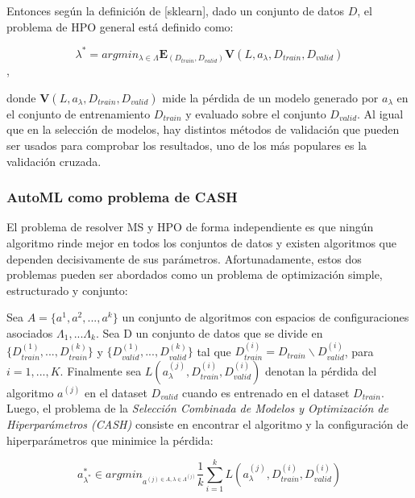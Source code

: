 Entonces según la definición de [sklearn], dado un conjunto de datos $D$, el problema de HPO general está definido como:

\begin{equation}
	\lambda^* = argmin_{\lambda \in \Lambda}\textbf{E}_{(D_{train}, D_{valid})}\textbf{V}(L, a_\lambda, D_{train}, D_{valid})
\end{equation},

donde $\textbf{V}(L, a_\lambda, D_{train}, D_{valid})$ mide la pérdida de un modelo generado por $a_\lambda$ en el conjunto de entrenamiento $D_{train}$ y evaluado sobre el conjunto $D_{valid}$. Al igual que en la selección de modelos, hay distintos métodos de validación que pueden ser usados para comprobar los resultados, uno de los más populares es la validación cruzada.

\subsubsection{AutoML como problema de CASH} 

El problema de resolver MS y HPO de forma independiente es que ningún algoritmo rinde mejor en todos los conjuntos de datos y existen algoritmos que dependen decisivamente de sus parámetros. Afortunadamente, estos dos problemas pueden ser abordados como un problema de optimización simple, estructurado y conjunto:

\begin{definition}
	Sea $A = \{a^1, a^2, ..., a^k\}$ un conjunto de algoritmos con espacios de configuraciones asociados $\Lambda_1, ... \Lambda_k$. Sea D un conjunto de datos que se divide en $\{D_{train}^{(1)}, ..., D_{train}^{(k)}\}$ y $\{D_{valid}^{(1)}, ..., D_{valid}^{(k)}\}$ tal que $D^{(i)}_{train} = D_{train}\backslash D_{valid}^{(i)}$, para $i=1,...,K$. Finalmente sea $L(a_\lambda^{(j)}, D_{train}^{(i)}, D_{valid}^{(i)})$ denotan la pérdida del algoritmo $a^{(j)}$ en el dataset $D_{valid}$ cuando es entrenado en el dataset $D_{train}$. Luego, el problema de la \textsl{Selección Combinada de Modelos y Optimización de Hiperparámetros (CASH)} consiste en encontrar el algoritmo y la configuración de hiperparámetros que minimice la pérdida:
	
	\begin{equation}\label{cash}
	 a^*_{\lambda^*} \in argmin_{a^{(j) \in A, \lambda \in \Lambda^{(j)}}} \dfrac{1}{k} \sum_{i=1}^{k} L\left(a_\lambda^{(j)}, D_{train}^{(i)}, D_{valid}^{(i)}\right)
	\end{equation}
\end{definition}   

